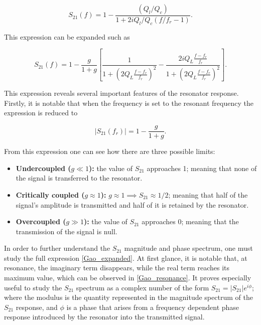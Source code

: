 \documentclass[12pt, a4paper]{article}
\begin{document}
\begin{equation}
    \label{Gao}
    S_{21}(f) = 1 - \frac{(Q_l / Q_c)}{1 + 2 i Q_l / Q_c (f / f_r - 1)}.
\end{equation}

This expression can be expanded such as 

\begin{equation}
    \label{Gao_expanded}
    S_{21}(f) = 1 - \frac{g}{1 + g} \left[ \frac{1}{1 + \left( 2 Q_L \frac{f - f_r}{f_r} \right)^2} - \frac{2 i Q_L \frac{f - f_r}{f_r}}{1 + \left( 2 Q_L \frac{f - f_r}{f_r} \right)^2} \right].
\end{equation}

This expression reveals several important features of the resonator response. Firstly, it is notable that when the frequency is set to the resonant frequency the expression is reduced to

\begin{equation}
    |S_{21}(f_r)| = 1 - \frac{g}{1 + g}.
    \label{Gao_resonance}
\end{equation}

From this expression one can see how there are three possible limits:

\begin{itemize}
    \item \textbf{Undercoupled ($g \ll 1$):} the value of $S_{21}$ approaches 1; meaning that none of the signal is transferred to the resonator.
    \item \textbf{Critically coupled ($g \approx 1$):} $g \approx 1\implies S_{21} \approx 1/2$; meaning that half of the signal's amplitude is transmitted and half of it is retained by the resonator.
    \item \textbf{Overcoupled ($g \gg 1$):} the value of $S_{21}$ approaches 0; meaning that the transmission of the signal is null.
\end{itemize}

In order to further understand the $S_{21}$ magnitude and phase spectrum, one must study the full expression \cref{Gao_expanded}. At first glance, it is notable that, at resonance, the imaginary term disappears, while the real term reaches its maximum value, which can be observed in \cref{Gao_resonance}. It proves especially useful to study the $S_{21}$ spectrum as a complex number of the form $S_{21} = |S_{21}|e^{i\phi}$; where the modulus is the quantity represented in the magnitude spectrum of the $S_{21}$ response, and $\phi$ is a phase that arises from a frequency dependent phase response introduced by the resonator into the transmitted signal.
\end{document}
